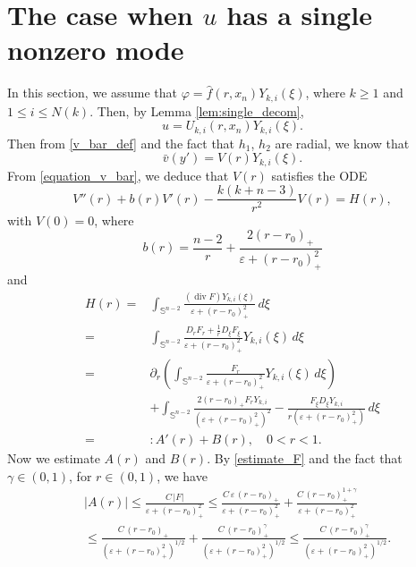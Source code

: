 \documentclass[reqno, 10pt]{amsart}
\theoremstyle{plain}
\theoremstyle{definition}
\theoremstyle{remark}
\newcommand{\dv}{\operatorname{div}}
\numberwithin{equation}{section}
\newcommand{\bS}{\mathbb{S}}
\begin{document}
\section{The case when \texorpdfstring{$u$}{u} has a single nonzero mode}\label{sec3}
In this section, we assume that $\varphi=\hat{f}(r,x_n)Y_{k,i}(\xi)$, where $k\ge 1$ and $1\le i\le N(k)$.  Then, by Lemma \ref{lem:single_decom},
\begin{equation}\label{nonzero-mode}
u=U_{k,i}(r,x_n)Y_{k,i}(\xi).
\end{equation}
Then from \eqref{v_bar_def} and the fact that $h_1$, $h_2$ are radial, we know that
$$
\bar{v}(y') = V(r) Y_{k,i}(\xi).
$$
From \eqref{equation_v_bar}, we deduce that $V(r)$ satisfies the ODE
\begin{equation}\label{ODE1}
V''(r) + b(r)V'(r) - \frac{k(k+n-3)}{r^2}V(r) = H(r),
\end{equation}
with $V(0) = 0$, where
\begin{equation}\label{b_expression}
b(r) = \frac{n-2}{r} + \frac{2(r-r_0)_+}{\varepsilon + (r-r_0)_+^2}
\end{equation}
and
\begin{align*}
H(r) =& \int_{\bS^{n-2}} \frac{(\dv F) Y_{k,i}(\xi)}{\varepsilon+(r-r_0)_+^2} \, d\xi \\
=& \int_{\bS^{n-2}} \frac{D_r F_r + \frac{1}{r} D_\xi F_\xi}{\varepsilon + (r-r_0)_+^2} Y_{k,i}(\xi) \, d\xi\\
=& \partial_r \left(\int_{\bS^{n-2}} \frac{F_r}{\varepsilon + (r-r_0)_+^2} Y_{k,i}(\xi) \, d\xi \right)\\ 
&+ \int_{\bS^{n-2}} \frac{2(r-r_0)_+F_r Y_{k,i}}{(\varepsilon+(r-r_0)_+^2)^2} - \frac{F_\xi D_\xi Y_{k,i}}{r(\varepsilon + (r-r_0)_+^2)}\, d\xi\\
=&: A'(r) + B(r), \quad 0 < r < 1.
\end{align*}
Now we estimate $A(r)$ and $B(r)$.
By \eqref{estimate_F} and the fact that $\gamma\in(0,1)$, for $r\in(0,1)$,
we have
\begin{equation}\label{est:A1}
\begin{aligned}
    &|A(r)|\le \frac{C\,|F|}{\varepsilon + (r-r_0)_+^2}\le \frac{C\,\varepsilon\,(r-r_0)_+}{\varepsilon + (r-r_0)_+^2}+\frac{C\,(r-r_0)_+^{1+\gamma}}{\varepsilon + (r-r_0)_+^2
    }\\
    &\le \frac{C\,(r-r_0)_+}{(\varepsilon + (r-r_0)_+^2)^{1/2}}+\frac{C\,(r-r_0)_+^\gamma}{(\varepsilon + (r-r_0)_+^2)^{1/2}}\le
    \frac{C\,(r-r_0)_+^\gamma}{(\varepsilon + (r-r_0)_+^2)^{1/2}}.
\end{aligned}
\end{equation}
\end{document}
